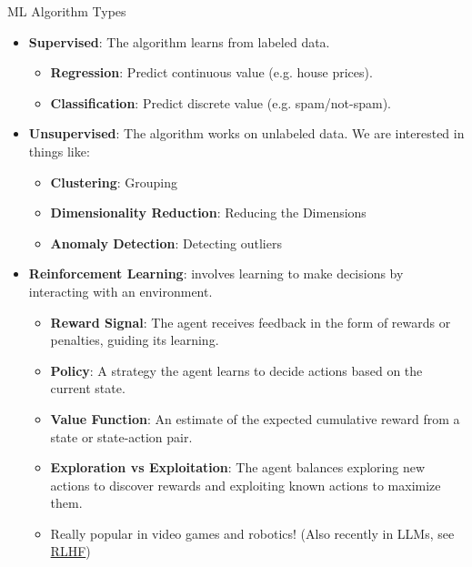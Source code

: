 \begin{frame}[allowframebreaks]{ML Algorithm Types}
    \begin{itemize}
        \item \textbf{Supervised}: The algorithm learns from labeled data.
        \begin{itemize}
            \item \textbf{Regression}: Predict continuous value (e.g. house prices).
            \item \textbf{Classification}: Predict discrete value (e.g. spam/not-spam).
        \end{itemize}

        \item \textbf{Unsupervised}: The algorithm works on unlabeled data. We are interested in things like:
        \begin{itemize}
            \item \textbf{Clustering}: Grouping
            \item \textbf{Dimensionality Reduction}: Reducing the Dimensions
            \item \textbf{Anomaly Detection}: Detecting outliers
        \end{itemize}

        \item \textbf{Reinforcement Learning}: involves learning to make decisions by interacting with an environment.
        \begin{itemize}
            \item \textbf{Reward Signal}: The agent receives feedback in the form of rewards or penalties, guiding its learning.
            \item \textbf{Policy}: A strategy the agent learns to decide actions based on the current state.
            \item \textbf{Value Function}: An estimate of the expected cumulative reward from a state or state-action pair.
            \item \textbf{Exploration vs Exploitation}: The agent balances exploring new actions to discover rewards and exploiting known actions to maximize them.
            \item Really popular in video games and robotics! (Also recently in LLMs, see \href{https://www.superannotate.com/blog/rlhf-for-llm}{RLHF})
        \end{itemize}
    \end{itemize}
\end{frame}


